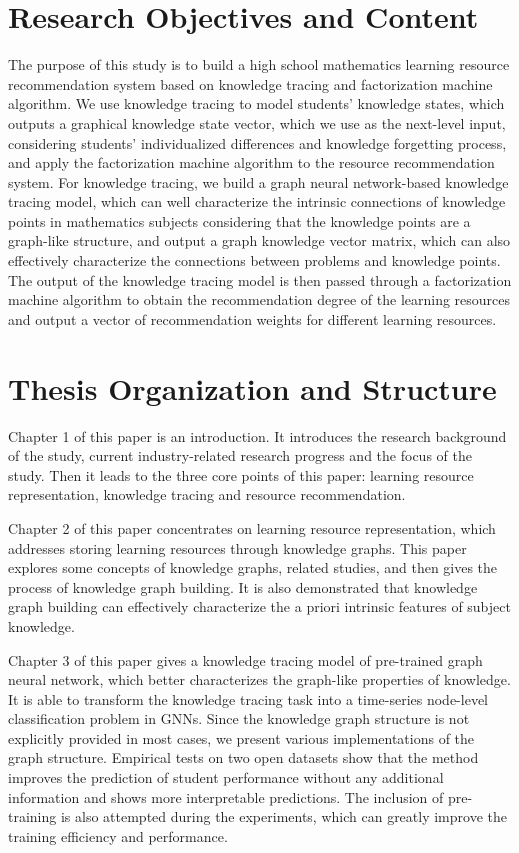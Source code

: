 \section{Research Objectives and Content}  %
The purpose of this study is to build a high school mathematics learning resource recommendation system based on knowledge tracing and factorization machine algorithm. We use knowledge tracing to model students' knowledge states, which outputs a graphical knowledge state vector, which we use as the next-level input, considering students' individualized differences and knowledge forgetting process, and apply the factorization machine algorithm to the resource recommendation system. For knowledge tracing, we build a graph neural network-based knowledge tracing model, which can well characterize the intrinsic connections of knowledge points in mathematics subjects considering that the knowledge points are a graph-like structure, and output a graph knowledge vector matrix, which can also effectively characterize the connections between problems and knowledge points. The output of the knowledge tracing model is then passed through a factorization machine algorithm to obtain the recommendation degree of the learning resources and output a vector of recommendation weights for different learning resources.

\section{Thesis Organization and Structure}
Chapter 1 of this paper is an introduction. It introduces the research background of the study, current industry-related research progress and the focus of the study. Then it leads to the three core points of this paper: learning resource representation, knowledge tracing and resource recommendation.

Chapter 2 of this paper concentrates on learning resource representation, which addresses storing learning resources through knowledge graphs. This paper explores some concepts of knowledge graphs, related studies, and then gives the process of knowledge graph building. It is also demonstrated that knowledge graph building can effectively characterize the a priori intrinsic features of subject knowledge.

Chapter 3 of this paper gives a knowledge tracing model of pre-trained graph neural network, which better characterizes the graph-like properties of knowledge. It is able to transform the knowledge tracing task into a time-series node-level classification problem in GNNs. Since the knowledge graph structure is not explicitly provided in most cases, we present various implementations of the graph structure. Empirical tests on two open datasets show that the method improves the prediction of student performance without any additional information and shows more interpretable predictions. The inclusion of pre-training is also attempted during the experiments, which can greatly improve the training efficiency and performance.

